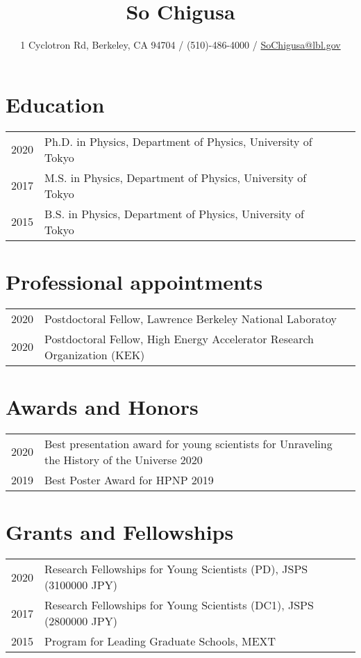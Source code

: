 \documentclass[12pt]{article}
\title{{\Large So Chigusa}}
\author{1 Cyclotron Rd, Berkeley, CA 94704 / (510)-486-4000 / \href{mailto:SoChigusa@lbl.gov}{SoChigusa@lbl.gov}}
\date{\vspace{-.5in}}
\begin{document}
\maketitle

\section*{Education}
\begin{table}[h]
 \begin{tabular}{llll}
  2020 & Ph.D. in Physics, Department of Physics, University of Tokyo \\
  2017 & M.S. in Physics, Department of Physics, University of Tokyo \\
  2015 & B.S. in Physics, Department of Physics, University of Tokyo
 \end{tabular}
\end{table}

\section*{Professional appointments}
\begin{table}[h]
  \begin{tabular}{ll}
    2020 & Postdoctoral Fellow, Lawrence Berkeley National Laboratoy \\
    2020 & Postdoctoral Fellow, High Energy Accelerator Research Organization (KEK)
  \end{tabular}
\end{table}

\section*{Awards and Honors}
\begin{table}[h]
  \begin{tabular}{ll}
    2020 & Best presentation award for young scientists for Unraveling the History of the Universe 2020 \\ 2019 & Best Poster Award for HPNP 2019
  \end{tabular}
\end{table}

\section*{Grants and Fellowships}
\begin{table}[H]
  \begin{tabular}{ll}
    2020 & Research Fellowships for Young Scientists (PD), JSPS (3100000 JPY) \\
    2017 & Research Fellowships for Young Scientists (DC1), JSPS (2800000 JPY) \\
    2015 & Program for Leading Graduate Schools, MEXT
  \end{tabular}
\end{table}
\end{document}
